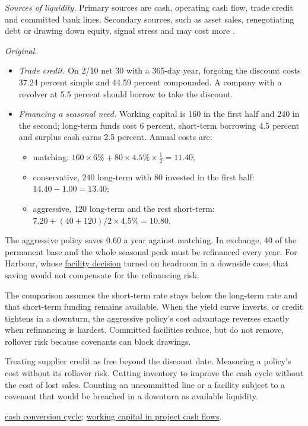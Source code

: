\begin{qfmethod}
\emph{Sources of liquidity.} Primary sources are cash, operating cash flow, trade credit and committed bank lines. Secondary sources, such as asset sales, renegotiating debt or drawing down equity, signal stress and may cost more \citep[p.~544]{financial-statement-analysis-2009}.

 \emph{Original.}
\begin{itemize}
\item \emph{Trade credit.} On 2/10 net 30 with a 365-day year, forgoing the discount costs 37.24 percent simple and 44.59 percent compounded. A company with a revolver at 5.5 percent should borrow to take the discount.
\item \emph{Financing a seasonal need.} Working capital is 160 in the first half and 240 in the second; long-term funds cost 6 percent, short-term borrowing 4.5 percent and surplus cash earns 2.5 percent. Annual costs are:
\begin{itemize}
\item matching: $160\times6\%+80\times4.5\%\times\tfrac12=11.40$;
\item conservative, 240 long-term with 80 invested in the first half: $14.40-1.00=13.40$;
\item aggressive, 120 long-term and the rest short-term: $7.20+(40+120)/2\times4.5\%=10.80$.
\end{itemize}
\end{itemize}
The aggressive policy saves 0.60 a year against matching. In exchange, 40 of the permanent base and the whole seasonal peak must be refinanced every year. For Harbour, whose \hyperref[ex:integrated-credit-decision]{facility decision} turned on headroom in a downside case, that saving would not compensate for the refinancing risk.

 The comparison assumes the short-term rate stays below the long-term rate and that short-term funding remains available. When the yield curve inverts, or credit tightens in a downturn, the aggressive policy's cost advantage reverses exactly when refinancing is hardest. Committed facilities reduce, but do not remove, rollover risk because covenants can block drawings.

 Treating supplier credit as free beyond the discount date. Measuring a policy's cost without its rollover risk. Cutting inventory to improve the cash cycle without the cost of lost sales. Counting an uncommitted line or a facility subject to a covenant that would be breached in a downturn as available liquidity.

 \hyperref[meth:cash-conversion-cycle]{cash conversion cycle}; \hyperref[meth:capital-project-evaluation]{working capital in project cash flows}.

\end{qfmethod}

